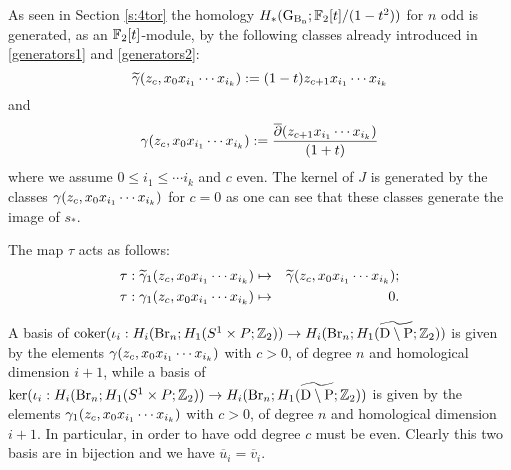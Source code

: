 As seen in Section \ref{s:4tor} the homology $H_*(\operatorname{G_{B_{n}}}; \mathbb{F}_2[t]/(1-t^2))$ for $n$ odd is generated, as an $\mathbb{F}_2[t]$-module, by the following classes already introduced in \eqref{generators1} and \eqref{generators2}:
\begin{equation*}
\widetilde{\gamma} (z_c, x_0 x_{i_1} \cdots x_{i_k}) :=(1-t)z_{c+1} x_{i_1} \cdots x_{i_k}
\end{equation*}
and
\begin{equation*}
\operatorname{\gamma}(z_c, x_0 x_{i_1} \cdots x_{i_k}):=\frac{\overline{\partial}(z_{c+1}x_{i_1} \cdots x_{i_k})}{(1+t)}
\end{equation*}
where we assume $0 \leq i_1 \leq \cdots i_k$ and $c$ even.
The kernel of $J$ is generated by the classes 
$\operatorname{\gamma}(z_c, x_0 x_{i_1} \cdots x_{i_k})$ for $c=0$ as one can see that these classes generate the image of $s_*$.

The map $\tau$ acts as follows:
\begin{eqnarray*}
\tau: \widetilde{\gamma}_1 (z_c, x_0 x_{i_1} \cdots x_{i_k}) & \mapsto & \widetilde{\gamma} (z_c, x_0 x_{i_1} \cdots x_{i_k});\\
\tau: \operatorname{\gamma_1} (z_c, x_0 x_{i_1} \cdots x_{i_k}) &\mapsto & 0.
\end{eqnarray*}

\begin{rem}\label{rem:basi_mod_2}
A basis of $\operatorname{\mathrm{coker}} (\iota_i :H_{i}(\operatorname{Br}_n; H_1(S^1 \times P;\mathbb{Z}_2)) \to H_{i}(\operatorname{Br}_n; H_1(\widetilde{\mathrm{D} \setminus \mathrm{P}};\mathbb{Z}_2) )$ is
given by the elements $\operatorname{\gamma} (z_c, x_0 x_{i_1} \cdots x_{i_k})$ with $c>0$, of degree $n$ and homological dimension $i+1$, while a basis of $ \ker (\iota_i :H_{i}(\operatorname{Br}_n; H_1(S^1 \times P;\mathbb{Z}_2)) \to H_{i}(\operatorname{Br}_n; H_1(\widetilde{\mathrm{D} \setminus \mathrm{P}};\mathbb{Z}_2) )$ is given by the elements $\operatorname{\gamma_1} (z_c, x_0 x_{i_1} \cdots x_{i_k})$ with $c>0$, of degree $n$ and homological dimension $i+1$.
In particular, in order to have odd degree $c$ must be even.
Clearly this two basis are in bijection and we have $\overline{u}_i = \overline{v}_i$.
\end{rem}
 

